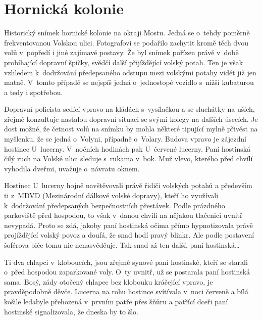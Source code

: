 
\chapter{Hornická kolonie}

Historický snímek hornické kolonie na okraji Mostu. Jedná se o~tehdy poměrně
frekventovanou Volskou ulici. Fotografovi se podařilo zachytit kromě těch dvou
volů v~popředí i jiné zajímavé postavy. Že byl snímek pořízen právě v~době
probíhající dopravní špičky, svědčí další přijíždějící volský potah. Ten je
však vzhledem k~dodržování předepsaného odstupu mezi volskými potahy vidět již
jen matně. V~tomto případě se nejspíš jedná o~jednostopé vozidlo s~nižší
kubaturou a tedy i spotřebou.

Dopravní policista sedící vpravo na kládách s~vysílačkou a se sluchátky na
uších, zřejmě konzultuje nastalou dopravní situaci se svými kolegy na dalších
úsecích. Je dost možné, že četnost volů na snímku by mohla některé tipující
mylně přivést na myšlenku, že se jedná o~Volyni, případně o~Volary. Budova
vpravo je zájezdní hostinec U~lucerny. V~nočních hodinách pak U~červené
lucerny. Paní hostinská čilý ruch na Volské ulici sleduje s~rukama v~bok. Muž
vlevo, kterého před chvílí vyhodila dveřmi, uvažuje o~návratu oknem.

Hostinec U~lucerny hojně navštěvovali právě řidiči volských potahů a především
ti z~MDVD (Mezinárodní dálkové volské dopravy), kteří ho využívali k~dodržování
předepsaných bezpečnostních přestávek. Podle prázdného parkoviště před
hospodou, to však v~danou chvíli na nějakou tlačenici uvnitř nevypadá. Proto se
zdá, jakoby paní hostinská očima přímo hypnotizovala právě projíždějící volský
povoz a doufá, že snad hodí pravý blinkr. Ale podle postavení šoférova biče
tomu nic nenasvědčuje. Tak snad až ten další, paní hostinská\dots{}

Ti dva chlapci v~kloboucích, jsou zřejmě synové paní hostinské, kteří se
starali o~před hospodou zaparkované voly. O~ty uvnitř, už se postarala paní
hostinská sama. Bosý, zády otočený chlapec bez klobouku kráčející vpravo, je
pravděpodobně děvče. Lucerna na rohu hostince svítívala v~noci červeně a bílá
košile ledabyle přehozená v~prvním patře přes šňůru a patřící dceři paní
hostinské signalizovala, že dneska by to šlo.

